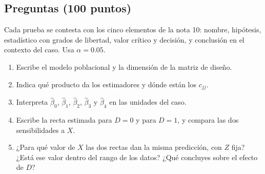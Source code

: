 \subsection*{Preguntas (100 puntos)}

Cada prueba se contesta con los cinco elementos de la nota 10: nombre, hipótesis, estadístico con grados de libertad, valor crítico y decisión, y conclusión en el contexto del caso. Usa $\alpha=0.05$.

\begin{enumerate}
  \item Escribe el modelo poblacional y la dimensión de la matriz de diseño.
  \item Indica qué producto da los estimadores y dónde están los $c_{jj}$.
  \item Interpreta $\hat\beta_0$, $\hat\beta_1$, $\hat\beta_2$, $\hat\beta_3$ y $\hat\beta_4$ en las unidades del caso.
  \item Escribe la recta estimada para $D=0$ y para $D=1$, y compara las dos sensibilidades a $X$.
  \item ¿Para qué valor de $X$ las dos rectas dan la misma predicción, con $Z$ fija? ¿Está ese valor dentro del rango de los datos? ¿Qué concluyes sobre el efecto de $D$?
\end{enumerate}

